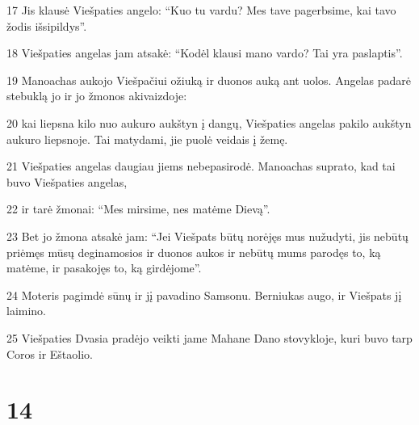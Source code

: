 \par 17 Jis klausė Viešpaties angelo: “Kuo tu vardu? Mes tave pagerbsime, kai tavo žodis išsipildys”. 
\par 18 Viešpaties angelas jam atsakė: “Kodėl klausi mano vardo? Tai yra paslaptis”. 
\par 19 Manoachas aukojo Viešpačiui ožiuką ir duonos auką ant uolos. Angelas padarė stebuklą jo ir jo žmonos akivaizdoje: 
\par 20 kai liepsna kilo nuo aukuro aukštyn į dangų, Viešpaties angelas pakilo aukštyn aukuro liepsnoje. Tai matydami, jie puolė veidais į žemę. 
\par 21 Viešpaties angelas daugiau jiems nebepasirodė. Manoachas suprato, kad tai buvo Viešpaties angelas, 
\par 22 ir tarė žmonai: “Mes mirsime, nes matėme Dievą”. 
\par 23 Bet jo žmona atsakė jam: “Jei Viešpats būtų norėjęs mus nužudyti, jis nebūtų priėmęs mūsų deginamosios ir duonos aukos ir nebūtų mums parodęs to, ką matėme, ir pasakojęs to, ką girdėjome”. 
\par 24 Moteris pagimdė sūnų ir jį pavadino Samsonu. Berniukas augo, ir Viešpats jį laimino. 
\par 25 Viešpaties Dvasia pradėjo veikti jame Mahane Dano stovykloje, kuri buvo tarp Coros ir Eštaolio.



\chapter{14}

